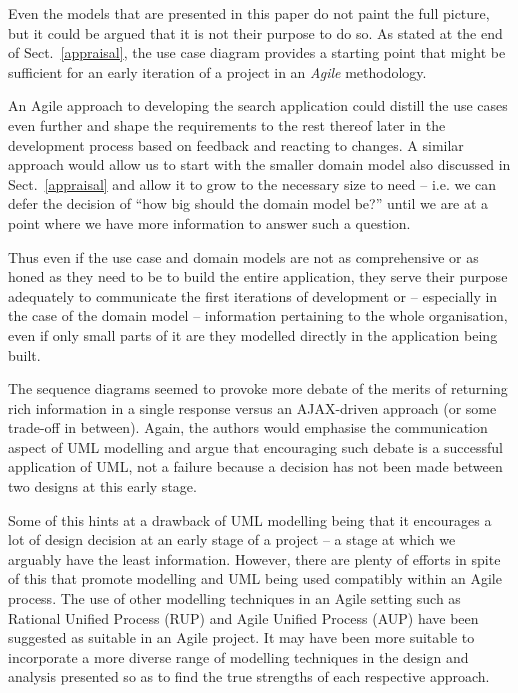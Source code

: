 \documentclass{llncs}
\begin{document}
Even the models that are presented in this paper do not paint the full
picture, but it could be argued that it is not their purpose to do so.
As stated at the end of Sect.~\ref{appraisal}, the use case diagram
provides a starting point that might be sufficient for an early
iteration of a project in an \emph{Agile} methodology.\cite{beck2001agile}

An Agile approach to developing the search application could distill
the use cases even further and shape the requirements to the rest
thereof later in the development process based on feedback and reacting
to changes. A similar approach would allow us to start with the smaller
domain model also discussed in Sect.~\ref{appraisal} and allow it to grow
to the necessary size to need -- i.e. we can defer the decision of ``how big
should the domain model be?'' until we are at a point where we have more
information to answer such a question.

Thus even if the use case and domain models are not as comprehensive or
as honed as they need to be to build the entire application, they serve
their purpose adequately to communicate the first iterations of
development or -- especially in the case of the domain model -- information
pertaining to the whole organisation, even if only small parts of it are
they modelled directly in the application being built.

The sequence diagrams seemed to provoke more debate of the merits of
returning rich information in a single response versus an AJAX-driven
approach (or some trade-off in between). Again, the authors would emphasise the
communication aspect of UML modelling and argue that encouraging such debate
is a successful application of UML, not a failure because a decision
has not been made between two designs at this early stage.

Some of this hints at a drawback of UML modelling being that it encourages
a lot of design decision at an early stage of a project -- a stage at which we arguably
have the least information.\cite{kelly2013conway} However, there are plenty of
efforts in spite of this that promote modelling and UML being used
compatibly within an Agile process. The use of other modelling techniques
in an Agile setting such as
Rational Unified Process (RUP) and Agile Unified Process (AUP) have been
suggested as suitable in an Agile project.
\cite{ambler2002agile} It may have been more suitable to incorporate
a more diverse range of modelling techniques in the design and analysis
presented so as to find the true strengths of each respective approach.
\end{document}
